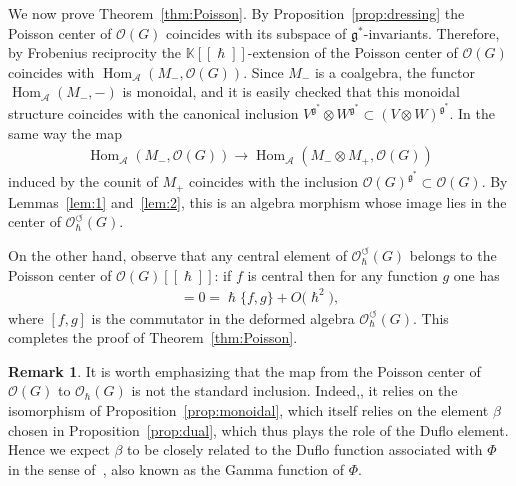 \documentclass[pdftex]{sigma}
\numberwithin{equation}{section}
\newcommand{\ca}{\circlearrowleft}
\newcommand{\mf}[1]{\mathfrak{#1}}
\newcommand{\h}{\hslash}
\newcommand{\ot}{\otimes}
\newcommand{\cO}{\mathcal O}
\newcommand{\cA}{\mathcal {A}}
\newcommand{\kk}{\mathbb K}
\renewcommand{\hom}{\operatorname{Hom}}
\theoremstyle{definition}
\newtheorem{rmk}[thm]{Remark}
\begin{document}
We now prove Theorem~\ref{thm:Poisson}. By Proposition~\ref{prop:dressing} the Poisson center of $\cO(G)$ coincides with its subspace of $\mf g^*$-invariants. Therefore, by Frobenius reciprocity the $\kk[[\h]]$-extension of the Poisson center of $\cO(G)$ coincides with $\hom_\cA(M_-,\cO(G))$. Since $M_-$ is a coalgebra, the functor $\hom_\cA(M_-,-)$ is monoidal, and it is easily checked that this monoidal structure coincides with the canonical inclusion $V^{\mf g^*}\ot W^{\mf g^*}\subset (V\ot W)^{\mf g^*}$. In the same way the map
\begin{gather*}
	\hom_\cA(M_-,\cO(G))\rightarrow \hom_\cA(M_- \ot M_+,\cO(G))
\end{gather*}
induced by the counit of $M_+$ coincides with the inclusion $\cO(G)^{\mf g^*} \subset \cO(G)$. By Lemmas~\ref{lem:1} and~\ref{lem:2}, this is an algebra morphism whose image lies in the center of $\cO_\h^\ca(G)$.

	On the other hand, observe that any central element of $\cO_\h^\ca(G)$ belongs to the Poisson center of $\cO(G)[[\h]]$: if $f$ is central then for any function $g$ one has
	\begin{gather*}
		[f,g]=0=\h\{f,g\}+O\big(\h^2\big),
	\end{gather*}
	where $[f,g]$ is the commutator in the deformed algebra $\cO_\h^\ca(G)$. This completes the proof of Theorem~\ref{thm:Poisson}.

	\begin{rmk}\label{rmk:gamma}
		It is worth emphasizing that the map from the Poisson center of $\cO(G)$ to $\cO_\h(G)$ is not the standard inclusion. Indeed,, it relies on the isomorphism of Proposition~\ref{prop:monoidal}, which itself relies on the element $\beta$ chosen in Proposition~\ref{prop:dual}, which thus plays the role of the Duf\/lo element. Hence we expect $\beta$ to be closely related to the Duf\/lo function associated with $\Phi$ in the sense of~\cite{Alekseev2010}, also known as the Gamma function of $\Phi$.
	\end{rmk}
\end{document}
